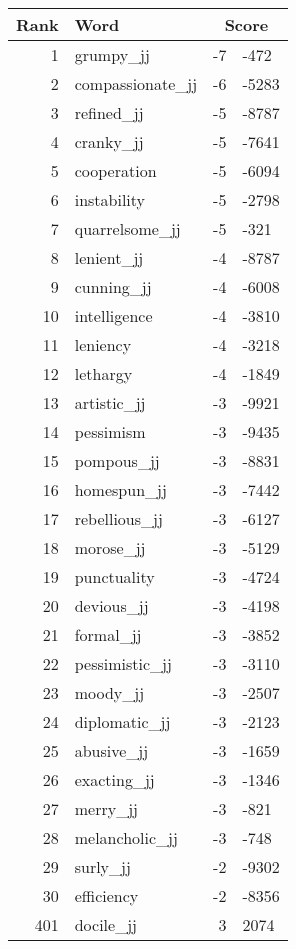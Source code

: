 \begin{longtable}[!htbp]{| rlr@{.}l |}
    \hline
    \textbf{Rank} & \textbf{Word} & \multicolumn{2}{c|}{\textbf{Score}} \\
    \hline
    \endhead
    1 & grumpy\_jj & -7 & -472 \\
    2 & compassionate\_jj & -6 & -5283 \\
    3 & refined\_jj & -5 & -8787 \\
    4 & cranky\_jj & -5 & -7641 \\
    5 & cooperation & -5 & -6094 \\
    6 & instability & -5 & -2798 \\
    7 & quarrelsome\_jj & -5 & -321 \\
    8 & lenient\_jj & -4 & -8787 \\
    9 & cunning\_jj & -4 & -6008 \\
    10 & intelligence & -4 & -3810 \\
    11 & leniency & -4 & -3218 \\
    12 & lethargy & -4 & -1849 \\
    13 & artistic\_jj & -3 & -9921 \\
    14 & pessimism & -3 & -9435 \\
    15 & pompous\_jj & -3 & -8831 \\
    16 & homespun\_jj & -3 & -7442 \\
    17 & rebellious\_jj & -3 & -6127 \\
    18 & morose\_jj & -3 & -5129 \\
    19 & punctuality & -3 & -4724 \\
    20 & devious\_jj & -3 & -4198 \\
    21 & formal\_jj & -3 & -3852 \\
    22 & pessimistic\_jj & -3 & -3110 \\
    23 & moody\_jj & -3 & -2507 \\
    24 & diplomatic\_jj & -3 & -2123 \\
    25 & abusive\_jj & -3 & -1659 \\
    26 & exacting\_jj & -3 & -1346 \\
    27 & merry\_jj & -3 & -821 \\
    28 & melancholic\_jj & -3 & -748 \\
    29 & surly\_jj & -2 & -9302 \\
    30 & efficiency & -2 & -8356 \\
    401 & docile\_jj & 3 & 2074 \\

\end{longtable}
